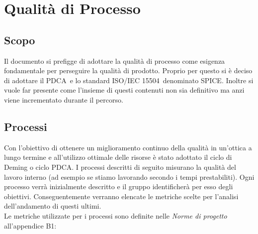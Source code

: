 \section{Qualità di Processo}
\subsection{Scopo}
Il documento si prefigge di adottare la qualità di processo come esigenza fondamentale per perseguire la qualità di prodotto. Proprio per questo si è deciso di adottare il PDCA\pedice~e lo standard ISO/IEC 15504\pedice~denominato SPICE. Inoltre si vuole far presente come l'insieme di questi contenuti non sia definitivo ma anzi viene incrementato durante il percorso.
\subsection{Processi}
Con l'obiettivo di ottenere un miglioramento continuo della qualità in un'ottica a lungo termine e all'utilizzo ottimale delle risorse è stato adottato il ciclo di Deming o ciclo PDCA.\newline
I processi descritti di seguito misurano la qualità del lavoro interno (ad esempio se stiamo lavorando secondo i tempi prestabiliti).
Ogni processo verrà inizialmente descritto e il gruppo identificherà per esso degli obiettivi. Conseguentemente verranno elencate le metriche scelte per l'analisi dell'andamento di questi ultimi. \\
Le metriche utilizzate per i processi sono definite nelle \textit{Norme di progetto} all'appendice B1:
\newpage
